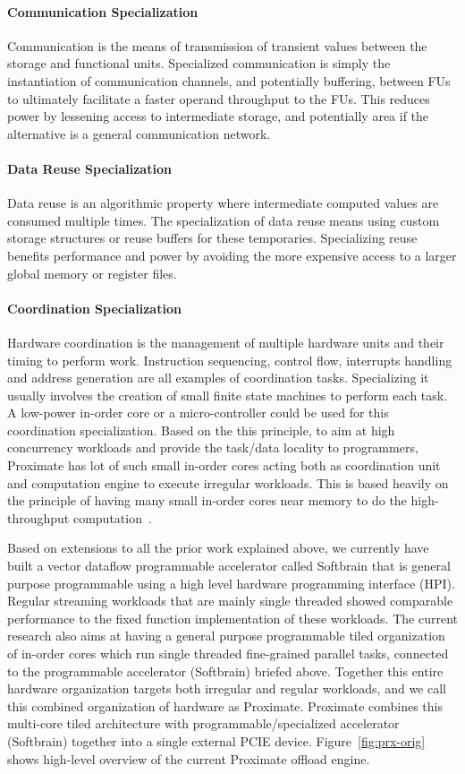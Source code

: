 \paragraph{Communication Specialization} Communication is the means of transmission of transient values between
the storage and functional units. Specialized communication is simply the instantiation of communication
channels, and potentially buffering, between FUs to ultimately facilitate a faster operand throughput to the
FUs. This reduces power by lessening access to intermediate storage, and potentially area if the alternative is
a general communication network.

\paragraph{Data Reuse Specialization} Data reuse is an algorithmic property where intermediate computed values
are consumed multiple times. The specialization of data reuse means using custom storage structures or
reuse buffers for these temporaries. Specializing reuse benefits performance and power by avoiding the more
expensive access to a larger global memory or register files.

\paragraph{Coordination Specialization} Hardware coordination is the management of multiple hardware units and
their timing to perform work. Instruction sequencing, control flow, interrupts handling and address generation
are all examples of coordination tasks. Specializing it usually involves the creation of small finite state
machines to perform each task. A low-power in-order core or a micro-controller could be used for this
coordination specialization. Based on the this principle, to aim at high concurrency workloads and provide 
the task/data locality to 
programmers, Proximate has lot of  such small in-order cores acting both 
as coordination unit and computation engine to execute irregular workloads. This is based heavily on the 
principle of having many small in-order cores near memory to do the high-throughput computation~\cite{menon2014memory}.

Based on extensions to all the prior work explained above,
we currently have built a vector dataflow programmable accelerator 
called Softbrain that is general purpose  
programmable using a high level hardware 
programming interface (HPI). 
Regular streaming workloads that are mainly 
single threaded showed comparable performance to the 
fixed function implementation of these workloads. 
The current research also aims at having a general purpose 
programmable tiled organization of 
in-order cores which run single threaded fine-grained parallel tasks,
connected to the programmable accelerator (Softbrain) briefed above. 
Together this entire hardware organization targets both 
irregular and regular workloads, and we call 
this combined organization of hardware as Proximate. 
Proximate combines this multi-core tiled architecture with
programmable/specialized accelerator (Softbrain) together into a 
single external PCIE device. Figure~\ref{fig:prx-orig} shows high-level
overview of the current Proximate offload engine. 

